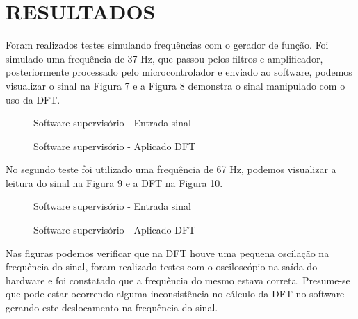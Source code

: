 \chapter{RESULTADOS}
Foram realizados testes simulando frequências com o gerador de função. Foi simulado uma frequência de 37 Hz, que passou pelos filtros e amplificador, posteriormente processado pelo microcontrolador e enviado ao software, podemos visualizar o sinal na Figura 7 e a Figura 8 demonstra o sinal manipulado com o uso da DFT.

\begin{figure}[htb]
	\caption{Software supervisório - Entrada sinal}
\end{figure}

\begin{figure}[htb]
	\caption{Software supervisório - Aplicado DFT}
\end{figure}

No segundo teste foi utilizado uma frequência de 67 Hz, podemos visualizar a leitura do sinal na Figura 9 e a DFT na Figura 10.

\begin{figure}[htb]
	\caption{Software supervisório - Entrada sinal}
\end{figure}

\begin{figure}[htb]
	\caption{Software supervisório - Aplicado DFT}
\end{figure}

Nas figuras podemos verificar que na DFT houve uma pequena oscilação na frequência do sinal, foram realizado testes com o osciloscópio na saída do hardware e foi constatado que a frequência do mesmo estava correta. Presume-se que pode estar ocorrendo alguma inconsistência no cálculo da DFT no software gerando este deslocamento na frequência do sinal. 

